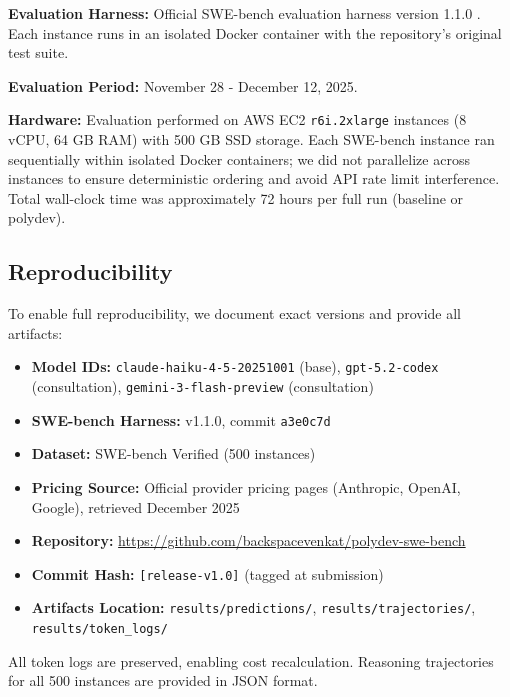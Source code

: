 \documentclass[11pt,a4paper]{article}
\begin{document}
\textbf{Evaluation Harness:} Official SWE-bench evaluation harness version 1.1.0 \citep{swebenchharness2024}. Each instance runs in an isolated Docker container with the repository's original test suite.

\textbf{Evaluation Period:} November 28 - December 12, 2025.

\textbf{Hardware:} Evaluation performed on AWS EC2 \texttt{r6i.2xlarge} instances (8 vCPU, 64 GB RAM) with 500 GB SSD storage. Each SWE-bench instance ran sequentially within isolated Docker containers; we did not parallelize across instances to ensure deterministic ordering and avoid API rate limit interference. Total wall-clock time was approximately 72 hours per full run (baseline or polydev).

\subsection{Reproducibility}

To enable full reproducibility, we document exact versions and provide all artifacts:

\begin{itemize}
    \item \textbf{Model IDs:} \texttt{claude-haiku-4-5-20251001} (base), \texttt{gpt-5.2-codex} (consultation), \texttt{gemini-3-flash-preview} (consultation)
    \item \textbf{SWE-bench Harness:} v1.1.0, commit \texttt{a3e0c7d}
    \item \textbf{Dataset:} SWE-bench Verified (500 instances)
    \item \textbf{Pricing Source:} Official provider pricing pages (Anthropic, OpenAI, Google), retrieved December 2025 \citep{anthropic2024pricing,openai2024pricing,google2024geminipricing}
    \item \textbf{Repository:} \url{https://github.com/backspacevenkat/polydev-swe-bench}
    \item \textbf{Commit Hash:} \texttt{[release-v1.0]} (tagged at submission)
    \item \textbf{Artifacts Location:} \texttt{results/predictions/}, \texttt{results/trajectories/}, \texttt{results/token\_logs/}
\end{itemize}

All token logs are preserved, enabling cost recalculation. Reasoning trajectories for all 500 instances are provided in JSON format.

\end{document}
